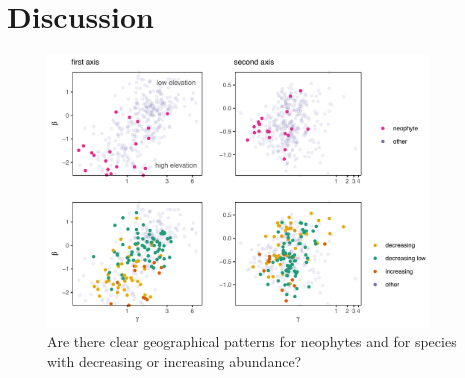 \documentclass[11pt, a4paper]{article}
\begin{document}


\section*{Discussion}
% 






\begin{figure}[h]
  \centering
    \vspace{0.5cm}
    \includegraphics[width=0.9\textwidth]{figures/invasive}
    	  \vspace{0.3cm}
	   \caption{Are there clear geographical patterns for neophytes and for species with decreasing or increasing abundance?}
      \label{fig:neophytes}
\end{figure}

\clearpage

\end{document}
